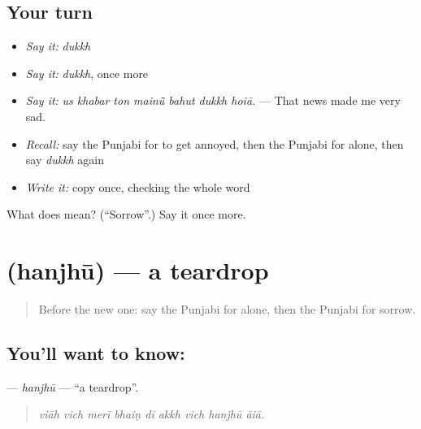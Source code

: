 \subsection*{Your turn}
\begin{itemize}
\raggedright
  \item \emph{Say it:} \emph{dukkh}
  \item \emph{Say it:} \emph{dukkh}, once more
  \item \emph{Say it:} \emph{us khabar ton mainū̃ bahut dukkh hoiā.} — That news made me very sad.
  \item \emph{Recall:} say the Punjabi for to get annoyed, then the Punjabi for alone, then say \emph{dukkh} again
  \item \emph{Write it:} copy \textbf{} once, checking the whole word
\end{itemize}

\begin{tcolorbox}[breakable,colback=teal!4,colframe=teal!35!black,title={Before you move on}]
What does  mean? (\textquotedblleft{}Sorrow\textquotedblright{}.) Say it once more.
\end{tcolorbox}
\section[\texorpdfstring{\pa{ਹੰਝੂ} (hanjhū)}{ਹੰਝੂ (hanjhū)}]{ (hanjhū) — a teardrop}

\label{lesson:PA-C327-hanjhu}



\begin{quote}
Before the new one: say the Punjabi for alone, then the Punjabi for sorrow.
\end{quote}

\subsection*{You'll want to know: }
\textbf{} — \emph{hanjhū} — \textquotedblleft{}a teardrop\textquotedblright{}.

\begin{quote}
        
\end{quote}

\begin{quote}
\emph{viāh vich merī bhaiṇ dī akkh vich hanjhū āiā.}
\end{quote}


